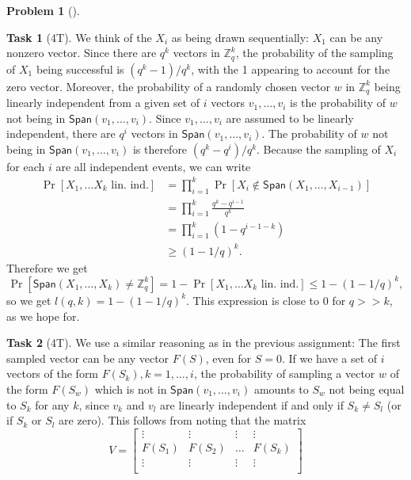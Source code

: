\documentclass[11pt,twoside]{article}
\theoremstyle{definition}
\newtheorem{amsproblem}{Problem}
\newtheorem{amssubproblem}{Task}[amsproblem]
\newenvironment{problem}[1][]{%
  \begin{amsproblem}[#1]
  }{%
  \end{amsproblem}
}
\newenvironment{subproblem}[1][]{%
  \begin{amssubproblem}[#1]
  }{%
  \end{amssubproblem}
}
\newcommand{\TP}[1]{#1T}
\newcommand{\Span}{\mathsf{Span}}
\newcommand{\Z}{\mathbb{Z}}
\begin{document}
\begin{problem}
  \begin{subproblem}[\TP{4}]
    We think of the $X_i$ as being drawn sequentially: $X_1$ can be any nonzero vector. Since there are $q^k$ vectors in $\Z_q^k$, the probability of the sampling of $X_1$ being successful is $(q^k-1)/q^k$, with the 1 appearing to account for the zero vector. Moreover, the probability of a randomly chosen vector $w$ in $\Z_q^k$ being linearly independent from a given set of $i$ vectors $v_1,\ldots,v_i$ is the probability of $w$ not being in $\Span(v_1, \ldots, v_i)$. Since $v_1,\ldots, v_i$ are assumed to be linearly independent, there are $q^i$ vectors in $\Span(v_1, \ldots, v_i)$. The probability of $w$ not being in $\Span(v_1, \ldots, v_i)$ is therefore $(q^k-q^i)/q^k$. Because the sampling of $X_i$ for each $i$ are all independent events, we can write
    \[
    \begin{aligned}
      \Pr[X_1, \ldots X_k \text{ lin. ind.}] &= \prod_{i= 1}^k \Pr[X_i \not\in \Span(X_1, \ldots, X_{i-1})] \\
      &= \prod_{i= 1}^k \frac{q^k - q^{i-1}}{q^k} \\
      &= \prod_{i= 1}^k \left(1-q^{i-1-k}\right) \\
      &\geq (1-1/q)^k.
    \end{aligned}
    \]
    Therefore we get
    \[
      \Pr[\Span(X_1, \ldots, X_k) \neq \Z_q^k] = 1 - \Pr[X_1, \ldots X_k \text{ lin. ind.}] \leq 1 - (1-1/q)^k,
    \]
    so we get $l(q, k) = 1 - (1-1/q)^k$.
    This expression is close to 0 for $q >> k$, as we hope for.
  \end{subproblem}
  \begin{subproblem}[\TP{4}]
    We use a similar reasoning as in the previous assignment: The first sampled vector can be any vector $F(S)$, even for $S = 0$. If we have a set of $i$ vectors of the form $F(S_k), k = 1, \ldots, i$, the probability of sampling a vector $w$ of the form $F(S_w)$ which is not in $\Span(v_1, \ldots, v_i)$ amounts to $S_w$ not being equal to $S_k$ for any $k$, since $v_k$ and $v_l$ are linearly independent if and only if $S_k \neq S_l$ (or if $S_k$ or $S_l$ are zero). This follows from noting that the matrix
    \[
    V=
      \begin{bmatrix}
        \vdots & \vdots & \vdots & \vdots \\
        F(S_1) & F(S_2) & \ldots & F(S_k) \\
        \vdots & \vdots & \vdots & \vdots \\
      \end{bmatrix}
\]
\end{subproblem}
\end{problem}
\end{document}
